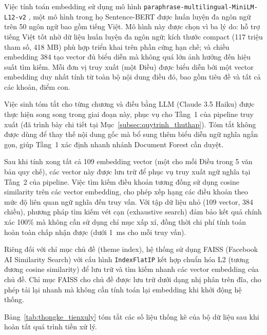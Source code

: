 Việc tính toán embedding sử dụng mô hình \texttt{paraphrase-multilingual-MiniLM-L12-v2}
\cite{reimers2019sbert}, một mô hình trong họ Sentence-BERT được huấn luyện đa
ngôn ngữ trên 50 ngôn ngữ bao gồm tiếng Việt. Mô hình này được chọn vì ba lý
do: hỗ trợ tiếng Việt tốt nhờ dữ liệu huấn luyện đa ngôn ngữ; kích thước
compact (117 triệu tham số, 418 MB) phù hợp triển khai trên phần cứng hạn chế;
và chiều embedding 384 tạo vector đủ biểu diễn mà không quá lớn ảnh hưởng
đến hiệu suất tìm kiếm. Mỗi đơn vị truy xuất (một Điều) được biểu diễn bởi một
vector embedding duy nhất tính từ toàn bộ nội dung điều đó, bao gồm tiêu đề và
tất cả các khoản, điểm con.

Việc sinh tóm tắt cho từng chương và điều bằng LLM (Claude 3.5 Haiku) được thực
hiện song song trong giai đoạn này, phục vụ cho Tầng~1 của pipeline truy xuất
(đã trình bày chi tiết tại Mục~\ref{subsec:quytrinh_thuthap}). Tóm tắt không
được dùng để thay thế nội dung gốc mà bổ sung thêm biểu diễn ngữ nghĩa ngắn
gọn, giúp Tầng~1 xác định nhanh nhánh Document Forest cần duyệt.

Sau khi tính xong tất cả 109 embedding vector (một cho mỗi Điều trong 5 văn bản
quy chế), các vector này được lưu trữ để phục vụ truy xuất ngữ nghĩa tại
Tầng~2 của pipeline. Việc tìm kiếm điều khoản tương đồng sử dụng cosine
similarity trên các vector embedding, cho phép xếp hạng các điều khoản theo
mức độ liên quan ngữ nghĩa đến truy vấn. Với tập dữ liệu nhỏ (109 vector,
384 chiều), phương pháp tìm kiếm vét cạn (exhaustive search) đảm bảo kết quả
chính xác 100\% mà không cần sử dụng chỉ mục xấp xỉ, đồng thời chi phí tính
toán hoàn toàn chấp nhận được (dưới 1~ms cho mỗi truy vấn).

Riêng đối với chỉ mục chủ đề (theme index), hệ thống sử dụng FAISS (Facebook
AI Similarity Search) với cấu hình \texttt{IndexFlatIP} kết hợp chuẩn hóa L2
(tương đương cosine similarity) để lưu trữ và tìm kiếm nhanh các vector embedding
của chủ đề. Chỉ mục FAISS cho chủ đề được lưu trữ dưới dạng nhị phân trên đĩa,
cho phép tải lại nhanh mà không cần tính toán lại embedding khi khởi động hệ thống.

Bảng~\ref{tab:thongke_tienxuly} tóm tắt các số liệu thống kê của bộ dữ liệu
sau khi hoàn tất quá trình tiền xử lý.

